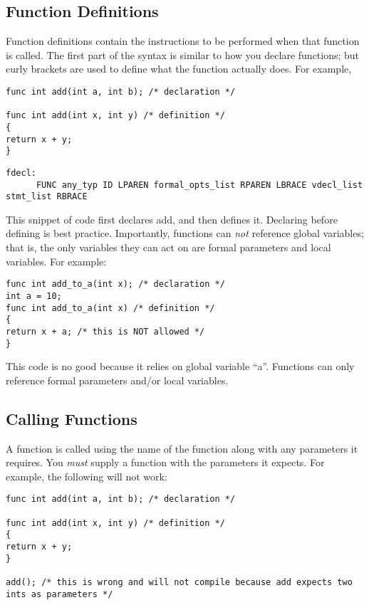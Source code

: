 \documentclass{article}
\begin{document}
\subsection{Function Definitions}
Function definitions contain the instructions to be performed when that function is called. The first part of the syntax is similar to how you declare functions; but curly brackets are used to define what the function actually does. For example, 

\begin{lstlisting}
func int add(int a, int b); /* declaration */

func int add(int x, int y) /* definition */
{
return x + y;
}
\end{lstlisting}

\begin{Verbatim}[frame=single]
fdecl:
	  FUNC any_typ ID LPAREN formal_opts_list RPAREN LBRACE vdecl_list stmt_list RBRACE
\end{Verbatim}

This snippet of code first declares add, and then defines it. Declaring before defining is best practice. Importantly, functions can \emph{not} reference global variables; that is, the only variables they can act on are formal parameters and local variables. For example:

\begin{lstlisting}
func int add_to_a(int x); /* declaration */
int a = 10;
func int add_to_a(int x) /* definition */
{
return x + a; /* this is NOT allowed */
}
\end{lstlisting}

This code is no good because it relies on global variable ``a''. Functions can only reference formal parameters and/or local variables.

\subsection{Calling Functions}

A function is called using the name of the function along with any parameters it requires. You \emph{must} supply a function with the parameters it expects. For example, the following will not work:

\begin{lstlisting}
func int add(int a, int b); /* declaration */

func int add(int x, int y) /* definition */
{
return x + y;
}

add(); /* this is wrong and will not compile because add expects two ints as parameters */

\end{lstlisting}
\end{document}
